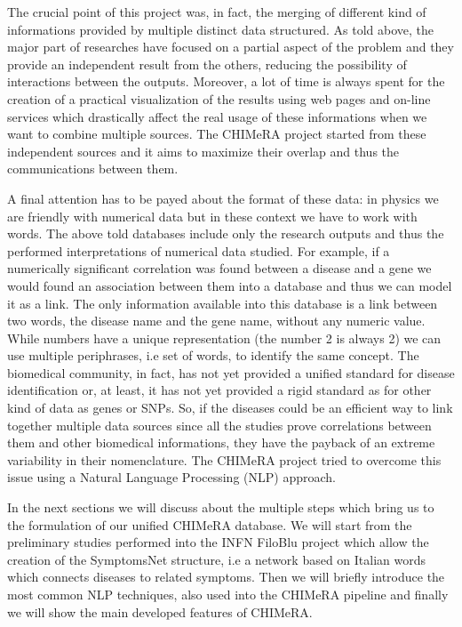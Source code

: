 \documentclass{standalone}
\begin{document}
The crucial point of this project was, in fact, the merging of different kind of informations provided by multiple distinct data structured.
As told above, the major part of researches have focused on a partial aspect of the problem and they provide an independent result from the others, reducing the possibility of interactions between the outputs.
Moreover, a lot of time is always spent for the creation of a practical visualization of the results using web pages and on-line services which drastically affect the real usage of these informations when we want to combine multiple sources.
The CHIMeRA project started from these independent sources and it aims to maximize their overlap and thus the communications between them.

A final attention has to be payed about the format of these data: in physics we are friendly with numerical data but in these context we have to work with words.
The above told databases include only the research outputs and thus the performed interpretations of numerical data studied.
For example, if a numerically significant correlation was found between a disease and a gene we would found an association between them into a database and thus we can model it as a link.
The only information available into this database is a link between two words, the disease name and the gene name, without any numeric value.
While numbers have a unique representation (the number 2 is always 2) we can use multiple periphrases, i.e set of words, to identify the same concept.
The biomedical community, in fact, has not yet provided a unified standard for disease identification or, at least, it has not yet provided a rigid standard as for other kind of data as genes or SNPs.
So, if the diseases could be an efficient way to link together multiple data sources since all the studies prove correlations between them and other biomedical informations, they have the payback of an extreme variability in their nomenclature.
The CHIMeRA project tried to overcome this issue using a Natural Language Processing (NLP) approach.

In the next sections we will discuss about the multiple steps which bring us to the formulation of our unified CHIMeRA database.
We will start from the preliminary studies performed into the INFN FiloBlu project which allow the creation of the SymptomsNet structure, i.e a  network based on Italian words which connects diseases to related symptoms.
Then we will briefly introduce the most common NLP techniques, also used into the CHIMeRA pipeline and finally we will show the main developed features of CHIMeRA.

\end{document}
